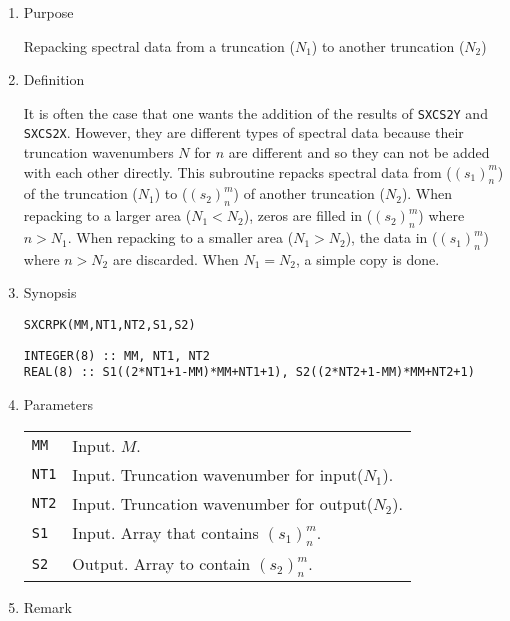 \documentclass[a4paper]{scrartcl}
\begin{document}
\begin{enumerate}

\item Purpose

Repacking spectral data from 
a truncation ($N_1$) to another truncation ($N_2$)

\item Definition

It is often the case that one wants the addition of the results
of \texttt{SXCS2Y} and \texttt{SXCS2X}. However, they are different
types of spectral data because their truncation wavenumbers $N$ for
$n$ are different and so they can not be added with each other
directly. This subroutine 
repacks spectral data from ($(s_1)^m_n$) of
the truncation ($N_1$) to ($(s_2)^m_n$)
of another truncation ($N_2$).
When repacking to a larger area ($N_1<N_2$),
zeros are filled in ($(s_2)^m_n$) where $n>N_1$.
When repacking to a smaller area ($N_1> N_2$),
the data in ($(s_1)^m_n$) where $n>N_2$ are discarded.
When $N_1=N_2$, a simple copy is done.

\item Synopsis

\texttt{SXCRPK(MM,NT1,NT2,S1,S2)}  

\begin{verbatim}
INTEGER(8) :: MM, NT1, NT2
REAL(8) :: S1((2*NT1+1-MM)*MM+NT1+1), S2((2*NT2+1-MM)*MM+NT2+1)
\end{verbatim}

\item Parameters
  
\begin{tabular}{ll}
\texttt{MM} & Input. $M$.\\  
\texttt{NT1} & Input. Truncation wavenumber for input($N_1$).\\
\texttt{NT2} & Input. Truncation wavenumber for output($N_2$).\\
\texttt{S1} & Input. Array that contains $(s_1)^m_n$.\\
\texttt{S2} & Output. Array to contain $(s_2)^m_n$.
\end{tabular}

\item Remark

\end{enumerate}
\end{document}
